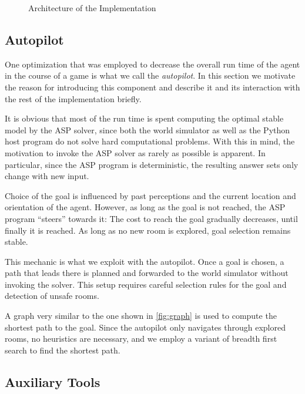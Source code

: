 \documentclass{llncs}
\begin{document}
\begin{figure}
\begin{center}

\end{center}
\caption{Architecture of the Implementation}
\label{fig:architecture}
\end{figure}

\subsection{Autopilot}

One optimization that was employed to decrease the overall run time of the agent in the course of a game is what we call the \emph{autopilot}. In this section we motivate the reason for introducing this component and describe it and its interaction with the rest of the implementation briefly.

It is obvious that most of the run time is spent computing the optimal stable model by the ASP solver, since both the world simulator as well as the Python host program do not solve hard computational problems. With this in mind, the motivation to invoke the ASP solver as rarely as possible is apparent. In particular, since the ASP program is deterministic, the resulting answer sets only change with new input.

Choice of the goal is influenced by past perceptions and the current location and orientation of the agent. However, as long as the goal is not reached, the ASP program \enquote{steers} towards it: The cost to reach the goal gradually decreases, until finally it is reached. As long as no new room is explored, goal selection remains stable.

This mechanic is what we exploit with the autopilot. Once a goal is chosen, a path that leads there is planned and forwarded to the world simulator without invoking the solver. This setup requires careful selection rules for the goal and detection of unsafe rooms.

A graph very similar to the one shown in \ref{fig:graph} is used to compute the shortest path to the goal.
Since the autopilot only navigates through explored rooms, no heuristics are necessary, and we employ a variant of breadth first search to find the shortest path.


\subsection{Auxiliary Tools}
\end{document}
